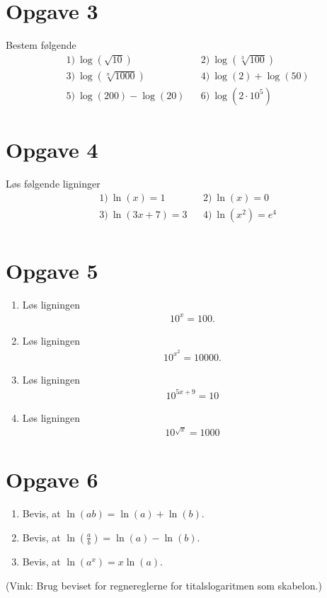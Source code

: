 \section*{Opgave 3}
Bestem følgende 
\begin{align*}
&1) \ \log(\sqrt{10})    &&2) \  \log(\sqrt[3]{100})  \\
&3) \ \log(\sqrt[n]{1000})   &&4) \ \log(2) + \log(50)    \\
&5) \ \log(200)-\log(20)   &&6) \ \log(2\cdot 10^5)   
\end{align*}

\section*{Opgave 4}
Løs følgende ligninger
\begin{align*}
&1) \ \ln(x)=1   &&2) \ \ln(x)=0    \\
&3) \ \ln(3x+7) = 3   &&4) \  \ln(x^2) = e^4   \\
\end{align*}

\section*{Opgave 5}
\begin{enumerate}[label=\roman*)]
	\item Løs ligningen
	\begin{align*}
		10^x = 100.
	\end{align*}
	\item Løs ligningen 
	\begin{align*}
		10^{x^2} = 10000.
	\end{align*}
	\item Løs ligningen 
	\begin{align*}
		10^{5x+9} = 10
	\end{align*}
	\item Løs ligningen 
	\begin{align*}
		10^{\sqrt{x}} = 1000
	\end{align*}
\end{enumerate}

\section*{Opgave 6}
\begin{enumerate}[label=\roman*)]
\item Bevis, at  $\ln(ab) = \ln(a)+\ln(b).$
\item Bevis, at  $\ln(\frac{a}{b}) = \ln(a)-\ln(b)$.
\item Bevis, at  $\ln(a^x) = x\ln(a)$.
\end{enumerate}
(Vink: Brug beviset for regnereglerne for titalslogaritmen som skabelon.)
